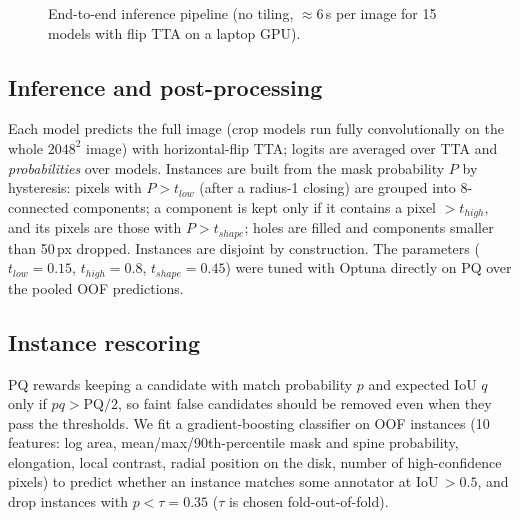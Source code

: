 \documentclass[sigconf]{acmart}
\begin{document}
\begin{figure}[t]
\centering
{}
\caption{End-to-end inference pipeline (no tiling, $\approx$6\,s per image for 15 models with flip TTA on a laptop GPU).}\label{fig:pipe}
\end{figure}

\subsection{Inference and post-processing}
Each model predicts the full image (crop models run fully convolutionally on the whole $2048^2$ image) with horizontal-flip TTA; logits are averaged over TTA and \emph{probabilities} over models. Instances are built from the mask probability $P$ by hysteresis: pixels with $P>t_{low}$ (after a radius-1 closing) are grouped into 8-connected components; a component is kept only if it contains a pixel $>t_{high}$, and its pixels are those with $P>t_{shape}$; holes are filled and components smaller than 50\,px dropped. Instances are disjoint by construction. The parameters ($t_{low}{=}0.15$, $t_{high}{=}0.8$, $t_{shape}{=}0.45$) were tuned with Optuna directly on PQ over the pooled OOF predictions.

\subsection{Instance rescoring}
PQ rewards keeping a candidate with match probability $p$ and expected IoU $q$ only if $pq>\mathrm{PQ}/2$, so faint false candidates should be removed even when they pass the thresholds. We fit a gradient-boosting classifier on OOF instances (10 features: log area, mean/max/90th-percentile mask and spine probability, elongation, local contrast, radial position on the disk, number of high-confidence pixels) to predict whether an instance matches some annotator at IoU\,$>0.5$, and drop instances with $p<\tau{=}0.35$ ($\tau$ is chosen fold-out-of-fold).
\end{document}
